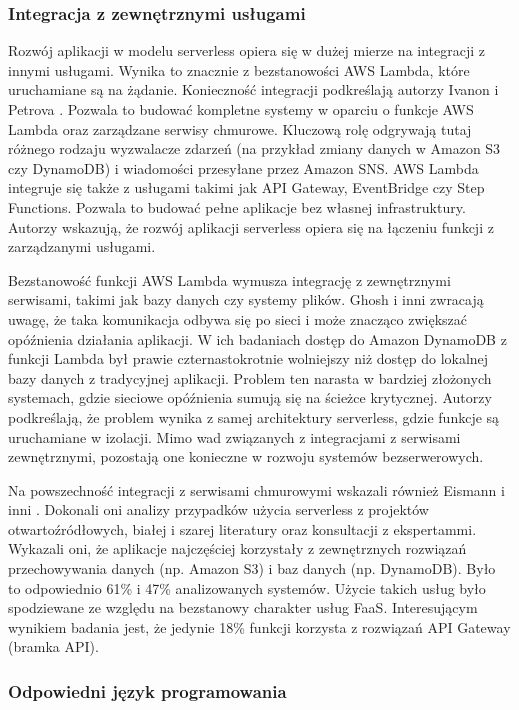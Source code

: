 \subsubsection*{Integracja z zewnętrznymi usługami}

Rozwój aplikacji w modelu serverless opiera się w dużej mierze na integracji z innymi usługami.
Wynika to znacznie z bezstanowości AWS Lambda, które uruchamiane są na żądanie.
Konieczność integracji podkreślają autorzy Ivanon i Petrova \cite{Ivanov_Petrova_2024}.
Pozwala to budować kompletne systemy w oparciu o funkcje AWS Lambda oraz zarządzane serwisy chmurowe.
Kluczową rolę odgrywają tutaj różnego rodzaju wyzwalacze zdarzeń (na przykład zmiany danych w Amazon S3 czy DynamoDB) i wiadomości przesyłane przez Amazon SNS.
AWS Lambda integruje się także z usługami takimi jak API Gateway, EventBridge czy Step Functions.
Pozwala to budować pełne aplikacje bez własnej infrastruktury.
Autorzy wskazują, że rozwój aplikacji serverless opiera się na łączeniu funkcji z zarządzanymi usługami.

Bezstanowość funkcji AWS Lambda wymusza integrację z zewnętrznymi serwisami, takimi jak bazy danych czy systemy plików.
Ghosh i inni \cite{9027427} zwracają uwagę, że taka komunikacja odbywa się po sieci i może znacząco zwiększać opóźnienia działania aplikacji.
W ich badaniach dostęp do Amazon DynamoDB z funkcji Lambda był prawie czternastokrotnie wolniejszy niż dostęp do lokalnej bazy danych z tradycyjnej aplikacji.
Problem ten narasta w bardziej złożonych systemach, gdzie sieciowe opóźnienia sumują się na ścieżce krytycznej.
Autorzy podkreślają, że problem wynika z samej architektury serverless, gdzie funkcje są uruchamiane w izolacji.
Mimo wad związanych z integracjami z serwisami zewnętrznymi, pozostają one konieczne w rozwoju systemów bezserwerowych.

Na powszechność integracji z serwisami chmurowymi wskazali również Eismann i inni \cite{eismann2021reviewserverlessusecases}.
Dokonali oni analizy przypadków użycia serverless z projektów otwartoźródłowych, białej i szarej literatury oraz konsultacji z ekspertammi.
Wykazali oni, że aplikacje najczęściej korzystały z zewnętrznych rozwiązań przechowywania danych (np. Amazon S3) i baz danych (np. DynamoDB).
Było to odpowiednio 61\% i 47\% analizowanych systemów.
Użycie takich usług było spodziewane ze względu na bezstanowy charakter usług FaaS.
Interesującym wynikiem badania jest, że jedynie 18\% funkcji korzysta z rozwiązań API Gateway (bramka API).

\subsubsection*{Odpowiedni język programowania}

